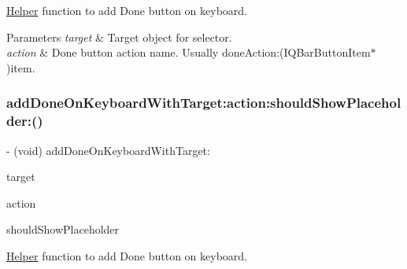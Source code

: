 \mbox{\hyperlink{interface_helper}{Helper}} function to add Done button on keyboard.


\begin{DoxyParams}{Parameters}
{\em target} & Target object for selector. \\
\hline
{\em action} & Done button action name. Usually \textquotesingle{}done\+Action\+:(\+I\+Q\+Bar\+Button\+Item$\ast$)item\textquotesingle{}. \\
\hline
\end{DoxyParams}
\mbox{\label{category_u_i_view_07_i_q_toolbar_addition_08_a4207824aee8c3668663e30906ed55f56}} 
\subsubsection{\texorpdfstring{add\+Done\+On\+Keyboard\+With\+Target\+:action\+:should\+Show\+Placeholder\+:()}{addDoneOnKeyboardWithTarget:action:shouldShowPlaceholder:()}\hspace{0.1cm}{\footnotesize\ttfamily [1/3]}}
{\footnotesize\ttfamily -\/ (void) add\+Done\+On\+Keyboard\+With\+Target\+: \begin{DoxyParamCaption}\item[{(nullable id)}]{target }\item[{action:(nullable S\+EL)}]{action }\item[{shouldShowPlaceholder:(B\+O\+OL)}]{should\+Show\+Placeholder }\end{DoxyParamCaption}}

\mbox{\hyperlink{interface_helper}{Helper}} function to add Done button on keyboard.


